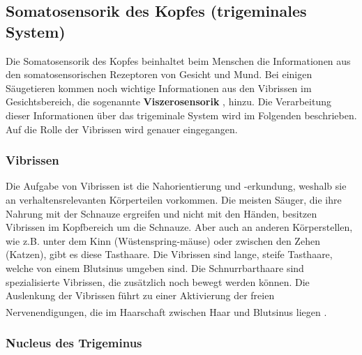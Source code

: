 \documentclass[12pt,a4paper,pdftex]{article}
\begin{document}
\newpage
\subsection{Somatosensorik des Kopfes (trigeminales System) }
\label{sec:somatokopf}
Die Somatosensorik des Kopfes beinhaltet beim Menschen die Informationen aus den somatosensorischen Rezeptoren von Gesicht und Mund. Bei einigen Säugetieren kommen noch wichtige Informationen aus den Vibrissen im Gesichtsbereich, die sogenannte \textbf{Viszerosensorik} , hinzu. Die Verarbeitung dieser Informationen über das trigeminale System wird im Folgenden beschrieben. Auf die Rolle der Vibrissen wird genauer eingegangen.

\subsubsection*{Vibrissen}
Die Aufgabe von Vibrissen ist die Nahorientierung und -erkundung, weshalb sie an verhaltensrelevanten Körperteilen vorkommen. Die meisten Säuger, die ihre Nahrung mit der Schnauze ergreifen und nicht mit den Händen, besitzen Vibrissen im Kopfbereich um die Schnauze. Aber auch an anderen Körperstellen, wie z.B. unter dem Kinn (Wüstenspring-mäuse) oder zwischen den Zehen (Katzen), gibt es diese Tasthaare. Die Vibrissen sind lange, steife Tasthaare, welche von einem Blutsinus umgeben sind. Die Schnurrbarthaare  sind spezialisierte Vibrissen, die zusätzlich noch bewegt werden können. 
Die Auslenkung der Vibrissen führt zu einer Aktivierung der freien Nervenendigungen, die im Haarschaft zwischen Haar und Blutsinus liegen \textsuperscript{\cite[5]{heldmaier2003tierphysiologie}}.

\subsubsection*{Nucleus des Trigeminus}
\end{document}
